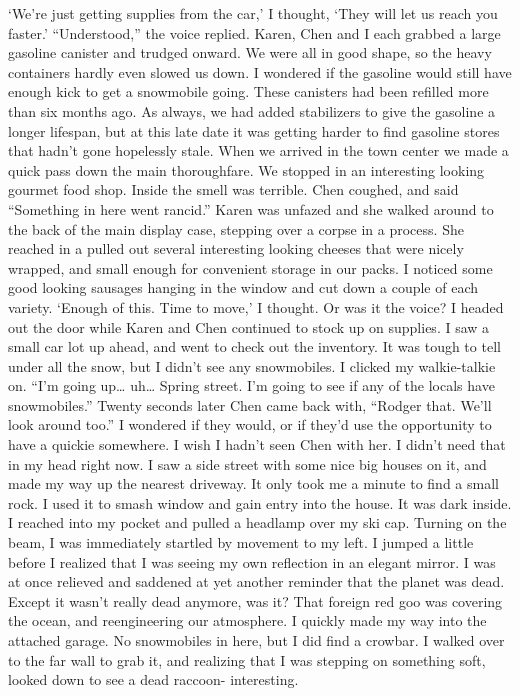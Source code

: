 \documentclass[a4paper]{article}
\begin{document}
‘We’re just getting supplies from the car,’ I thought, ‘They will let us reach you faster.’
“Understood,” the voice replied.
Karen, Chen and I each grabbed a large gasoline canister and trudged onward. We were all in good shape, so the heavy containers hardly even slowed us down.
I wondered if the gasoline would still have enough kick to get a snowmobile going. These canisters had been refilled more than six months ago. As always, we had added stabilizers to give the gasoline a longer lifespan, but at this late date it was getting harder to find gasoline stores that hadn’t gone hopelessly stale.
When we arrived in the town center we made a quick pass down the main thoroughfare. We stopped in an interesting looking gourmet food shop. Inside the smell was terrible.
Chen coughed, and said “Something in here went rancid.”
Karen was unfazed and she walked around to the back of the main display case, stepping over a corpse in a process. She reached in a pulled out several interesting looking cheeses that were nicely wrapped, and small enough for convenient storage in our packs.
I noticed some good looking sausages hanging in the window and cut down a couple of each variety. ‘Enough of this. Time to move,’ I thought. Or was it the voice?
I headed out the door while Karen and Chen continued to stock up on supplies. I saw a small car lot up ahead, and went to check out the inventory. It was tough to tell under all the snow, but I didn’t see any snowmobiles.
I clicked my walkie-talkie on. “I’m going up… uh… Spring street. I’m going to see if any of the locals have snowmobiles.”
Twenty seconds later Chen came back with, “Rodger that. We’ll look around too.”
I wondered if they would, or if they’d use the opportunity to have a quickie somewhere. I wish I hadn’t seen Chen with her. I didn’t need that in my head right now.
I saw a side street with some nice big houses on it, and made my way up the nearest driveway. It only took me a minute to find a small rock. I used it to smash window and gain entry into the house.
It was dark inside. I reached into my pocket and pulled a headlamp over my ski cap. Turning on the beam, I was immediately startled by movement to my left.
I jumped a little before I realized that I was seeing my own reflection in an elegant mirror. I was at once relieved and saddened at yet another reminder that the planet was dead. Except it wasn’t really dead anymore, was it? That foreign red goo was covering the ocean, and reengineering our atmosphere.
I quickly made my way into the attached garage. No snowmobiles in here, but I did find a crowbar. I walked over to the far wall to grab it, and realizing that I was stepping on something soft, looked down to see a dead raccoon- interesting.
\end{document}
